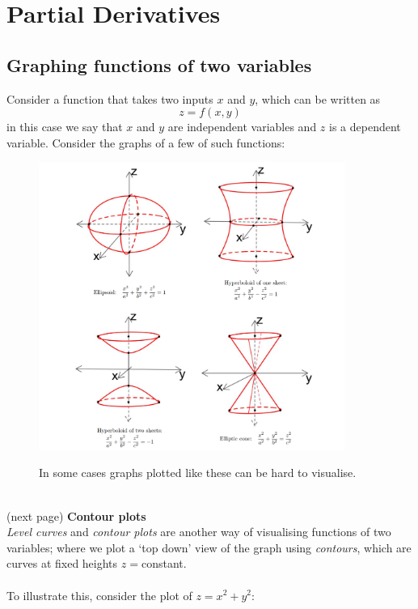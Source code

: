 \documentclass{report}
\begin{document}
\section{Partial Derivatives}
\subsection{Graphing functions of two variables}
Consider a function that takes two inputs $x$ and $y$, which can be written as
\begin{equation*}
z=f(x,y)
\end{equation*}
in this case we say that $x$ and $y$ are independent variables and $z$ is a dependent variable. Consider the 
graphs of a few of such functions:
\begin{figure}[h]
\begin{center}
\includegraphics[width=10cm]{93}\\
\end{center}
In some cases graphs plotted like these can be hard to visualise.
\end{figure}\\
(next page)
\newpage
\noindent\textbf{Contour plots}\\
\textit{Level curves} and \textit{contour plots} are another way of visualising functions of two variables; where 
we plot a `top down' view of the graph using \textit{contours}, which are curves at fixed heights $z=$constant.\\
\vspace{1mm}\\
To illustrate this, consider the plot of $z=x^2+y^2$:
\end{document}
